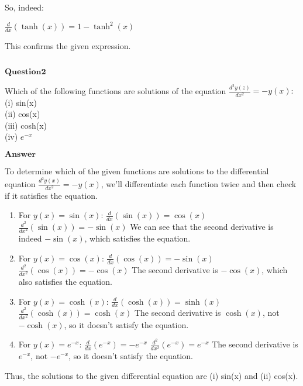 \documentclass[11pt]{article}
\makeatletter
\newcommand{\boxspacing}{\kern\kvtcb@left@rule\kern\kvtcb@boxsep}
\newcommand{\prompt}[4]{
        {\ttfamily\llap{{\color{#2}[#3]:\hspace{3pt}#4}}\vspace{-\baselineskip}}
    }
\makeatother
\begin{document}
So, indeed:

$ \frac{d}{dx}(\tanh(x)) = 1 - \tanh^2(x) $

This confirms the given expression.

    \begin{tcolorbox}[breakable, size=fbox, boxrule=1pt, pad at break*=1mm,colback=cellbackground, colframe=cellborder]
\prompt{In}{incolor}{ }{\boxspacing}
\begin{Verbatim}[commandchars=\\\{\}]

\end{Verbatim}
\end{tcolorbox}

    $\textbf{Question2}$

Which of the following functions are solutions of the equation
$ \frac{d^2y(z)}{dx^2} = -y(x): $   
(i) sin(x)  \\
(ii) cos(x)  \\
(iii) cosh(x)  \\
(iv) $e^{-x}$

$\textbf{Answer}$

    To determine which of the given functions are solutions to the
differential equation $\frac{d^2y(x)}{dx^2} = -y(x)$, we'll
differentiate each function twice and then check if it satisfies the
equation.

\begin{enumerate}
\def\labelenumi{(\roman{enumi})}
\item
  For $y(x) = \sin(x)$: $\frac{d}{dx}(\sin(x)) = \cos(x)$
  $\frac{d^2}{dx^2}(\sin(x)) = -\sin(x)$ We can see that the second
  derivative is indeed $-\sin(x)$, which satisfies the equation.
\item
  For $y(x) = \cos(x)$: $\frac{d}{dx}(\cos(x)) = -\sin(x)$
  $\frac{d^2}{dx^2}(\cos(x)) = -\cos(x)$ The second derivative is
  $-\cos(x)$, which also satisfies the equation.
\item
  For $y(x) = \cosh(x)$: $\frac{d}{dx}(\cosh(x)) = \sinh(x)$
  $\frac{d^2}{dx^2}(\cosh(x)) = \cosh(x)$ The second derivative is
  $\cosh(x)$, not $-\cosh(x)$, so it doesn't satisfy the equation.
\item
  For $y(x) = e^{-x}$: $\frac{d}{dx}(e^{-x}) = -e^{-x}$
  $\frac{d^2}{dx^2}(e^{-x}) = e^{-x}$ The second derivative is
  $e^{-x}$, not $-e^{-x}$, so it doesn't satisfy the equation.
\end{enumerate}

Thus, the solutions to the given differential equation are (i) sin(x)
and (ii) cos(x).
\end{document}
